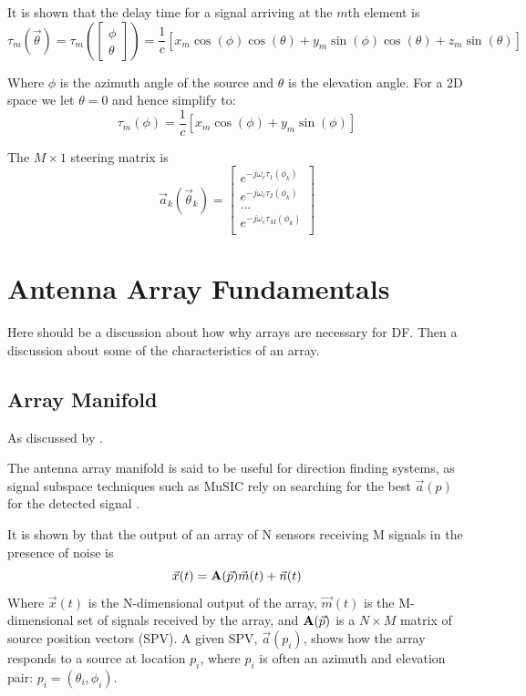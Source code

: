 It is shown that the delay time for a signal arriving at the \(m\)th element is
\begin{equation}
  \tau_m(\vec{\theta}) 
 = \tau_m( \begin{bmatrix} \phi \\ \theta \end{bmatrix} )
  = \frac{1}{c} [ x_m\cos(\phi)\cos(\theta) + y_m\sin(\phi)\cos(\theta) + z_m\sin(\theta) ]
\end{equation}

Where \(\phi\) is the azimuth angle of the source and \(\theta\) is the elevation angle.
For a 2D space we let \(\theta = 0\) and hence simplify to:
\begin{equation}
 \tau_m(\phi) = \frac{1}{c} [ x_m\cos(\phi) + y_m\sin(\phi) ]
\end{equation}

The \(M \times 1\) steering matrix is
\begin{equation}
  \vec{a}_k(\vec{\theta}_k) = 
  \begin{bmatrix}
    e^{-j\omega_c \tau_1(\phi_k)} \\
    e^{-j\omega_c \tau_2(\phi_k)} \\
    ... \\
    e^{-j\omega_c \tau_M(\phi_k)} \\
  \end{bmatrix}
\end{equation}

\section{Antenna Array Fundamentals}
Here should be a discussion about how why arrays are necessary for DF. Then a discussion about some of the characteristics of an array.
\subsection{Array Manifold}
As discussed by \cite{sleiman2000antenna} \cite{karimi1996manifold} \cite{dacos1995estimating}. 

The antenna array manifold is said to be useful for direction finding systems, as signal subspace techniques such as MuSIC rely on searching for the best \(\vec{a}(p)\) for the detected signal \cite{karimi1996manifold}. 

It is shown by \cite{dacos1995estimating} that the output of an array of N sensors receiving M signals in the presence of noise is
\begin{equation}
\vec{x}(t) = \mathbf{A}(\vec{p})\vec{m}(t) + \vec{n}(t)
\end{equation}
Where \(\vec{x}(t)\) is the N-dimensional output of the array, \(\vec{m}(t)\) is the M-dimensional set of signals received by the array, and \(\mathbf{A}(\vec{p})\) is a \(N \times M\) matrix of source position vectors (SPV). 
A given SPV, \(\vec{a}(p_i)\), shows how the array responds to a source at location \(p_i\), where \(p_i\) is often an azimuth and elevation pair: \(p_i = (\theta_i, \phi_i)\).

